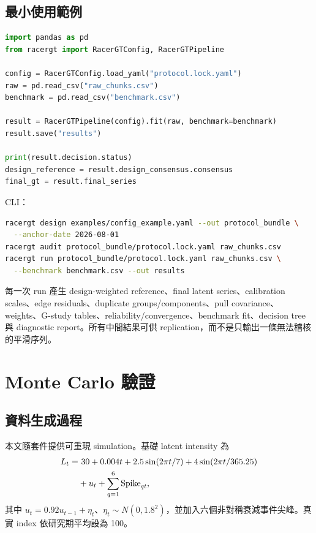 \documentclass[12pt,a4paper,oneside]{article}
\begin{document}
\subsection{最小使用範例}

\begin{lstlisting}[language=Python]
import pandas as pd
from racergt import RacerGTConfig, RacerGTPipeline

config = RacerGTConfig.load_yaml("protocol.lock.yaml")
raw = pd.read_csv("raw_chunks.csv")
benchmark = pd.read_csv("benchmark.csv")

result = RacerGTPipeline(config).fit(raw, benchmark=benchmark)
result.save("results")

print(result.decision.status)
design_reference = result.design_consensus.consensus
final_gt = result.final_series
\end{lstlisting}

CLI：
\begin{lstlisting}[language=bash]
racergt design examples/config_example.yaml --out protocol_bundle \
  --anchor-date 2026-08-01
racergt audit protocol_bundle/protocol.lock.yaml raw_chunks.csv
racergt run protocol_bundle/protocol.lock.yaml raw_chunks.csv \
  --benchmark benchmark.csv --out results
\end{lstlisting}

每一次 run 產生 design-weighted reference、final latent series、calibration scales、edge residuals、duplicate groups/components、pull covariance、weights、G-study tables、reliability/convergence、benchmark fit、decision tree 與 diagnostic report。所有中間結果可供 replication，而不是只輸出一條無法稽核的平滑序列。

\section{Monte Carlo 驗證}

\subsection{資料生成過程}

本文隨套件提供可重現 simulation。基礎 latent intensity 為
\begin{align}
L_t=&\ 30+0.004t+2.5\sin(2\pi t/7)
+4\sin(2\pi t/365.25)\notag\\
&+u_t+\sum_{q=1}^{6}\operatorname{Spike}_{qt},
\end{align}
其中 $u_t=0.92u_{t-1}+\eta_t$、$\eta_t\sim N(0,1.8^2)$，並加入六個非對稱衰減事件尖峰。真實 index 依研究期平均設為 100。
\end{document}
